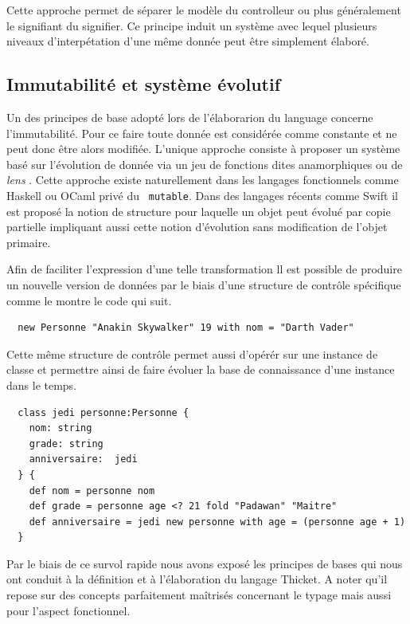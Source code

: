 \documentclass[twoside,a4paper]{article}
\begin{document}
Cette  approche permet  de séparer  le modèle  du controlleur  ou plus
généralement le signifiant du signifier. Ce principe induit un système
avec lequel  plusieurs niveaux d'interpétation d'une  même donnée peut
être simplement élaboré.

\subsection{Immutabilité et système évolutif}

Un  des principes  de base  adopté lors  de l'élaborarion  du language
concerne  l'immutabilité. Pour  ce faire  toute donnée  est considérée
comme constante et ne peut donc être alors modifiée. L'unique approche
consiste à proposer  un système basé sur l'évolution de  donnée via un
jeu   de   fonctions   dites    anamorphiques   ou   de   {\em   lens}
\cite{meijer1991functional}.  Cette approche existe naturellement dans
les  langages  fonctionnels  comme  Haskell ou  OCaml  privé  du  {\tt
  mutable}.  Dans des langages récents comme Swift \cite{swift} il est
proposé la notion de structure pour  laquelle un objet peut évolué par
copie  partielle  impliquant  aussi   cette  notion  d'évolution  sans
modification de l'objet primaire.

Afin  de  faciliter l'expression  d'une  telle  transformation ll  est
possible de produire un nouvelle version de données par le biais d'une
structure de contrôle spécifique comme le montre le code qui suit.

\lstset{language=Thicket}
\begin{lstlisting}
  new Personne "Anakin Skywalker" 19 with nom = "Darth Vader"
\end{lstlisting}

Cette  même  structure  de  contrôle permet  aussi  d'opérér  sur  une
instance de  classe et  permettre ainsi  de faire  évoluer la  base de
connaissance d'une instance dans le temps.

\lstset{language=Thicket}
\begin{lstlisting}
  class jedi personne:Personne {
    nom: string
    grade: string
    anniversaire:  jedi
  } {
    def nom = personne nom
    def grade = personne age <? 21 fold "Padawan" "Maitre"
    def anniversaire = jedi new personne with age = (personne age + 1)
  }
\end{lstlisting}

Par le  biais de ce survol  rapide nous avons exposé  les principes de
bases  qui nous  ont conduit  à la  définition et  à l'élaboration  du
langage Thicket.  A  noter qu'il repose sur  des concepts parfaitement
maîtrisés concernant le typage mais aussi pour l'aspect fonctionnel.
\end{document}
